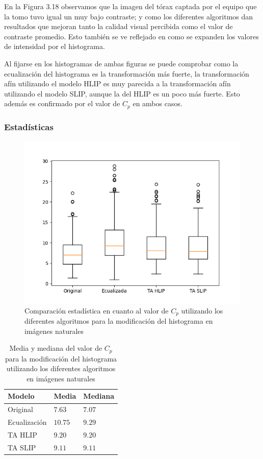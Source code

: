 En la Figura 3.18 observamos que la imagen del t\'orax captada por el equipo que la tomo tuvo igual un muy bajo contraste; y como los diferentes algoritmos dan resultados que mejoran tanto la calidad visual percibida como el valor de contraste promedio. Esto tambi\'en se ve reflejado en como se expanden los valores de intensidad por el histograma.

Al fijarse en los histogramas de ambas figuras se puede comprobar como la ecualizaci\'on del histograma es la transformaci\'on m\'as fuerte, la transformaci\'on af\'in utilizando el modelo HLIP  es muy parecida a la transformaci\'on af\'in utilizando el modelo SLIP, aunque la del HLIP es un poco m\'as fuerte. Esto adem\'as es confirmado por el valor de $C_p$ en ambos casos.

\subsubsection{Estad\'isticas}

\begin{figure}
	\begin{center}
		\includegraphics[width=10.0 cm]{images/graphics/natural/affine_transform/eq_all.png}
		\caption{Comparaci\'on estad\'istica en cuanto al valor de $C_p$ utilizando los diferentes algoritmos para la modificaci\'on del histograma en im\'agenes naturales}
	\end{center}
\end{figure}

\begin{table}
	\begin{center}
		\begin{tabular}{|l|l|l|}
			\hline 
			Modelo & Media & Mediana\\
			\hline
			Original & $7.63$ & $7.07$\\
			\hline
			Ecualizaci\'on & $10.75$ & $9.29$\\
			\hline
			TA HLIP & $9.20$ & $9.20$\\
			\hline
			TA SLIP & $9.11$ & $9.11$\\
			\hline
		\end{tabular}
		\caption{Media y mediana del valor de $C_p$ para la modificaci\'on del histograma utilizando los diferentes algoritmos en im\'agenes naturales}
	\end{center}
\end{table}

